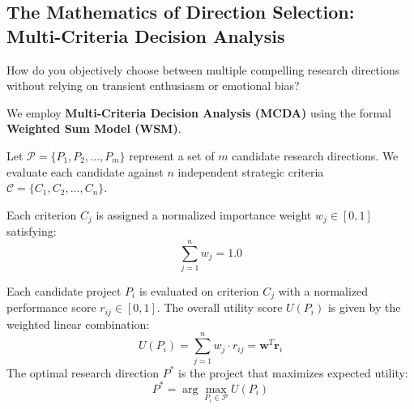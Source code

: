 \subsection{The Mathematics of Direction Selection: Multi-Criteria Decision Analysis}\label{subsec:mcda_model}

How do you objectively choose between multiple compelling research directions without relying on transient enthusiasm or emotional bias? 

We employ \textbf{Multi-Criteria Decision Analysis (MCDA)} using the formal \textbf{Weighted Sum Model (WSM)}.

\begin{keyidea}
Let $\mathcal{P} = \{P_1, P_2, \dots, P_m\}$ represent a set of $m$ candidate research directions. We evaluate each candidate against $n$ independent strategic criteria $\mathcal{C} = \{C_1, C_2, \dots, C_n\}$.

Each criterion $C_j$ is assigned a normalized importance weight $w_j \in [0, 1]$ satisfying:
\begin{equation}
\sum_{j=1}^{n} w_j = 1.0\label{eq:sum_weights}
\end{equation}

Each candidate project $P_i$ is evaluated on criterion $C_j$ with a normalized performance score $r_{ij} \in [0, 1]$. The overall utility score $U(P_i)$ is given by the weighted linear combination:
\begin{equation}
U(P_i) = \sum_{j=1}^{n} w_j \cdot r_{ij} = \mathbf{w}^T \mathbf{r}_i\label{eq:utility_score}
\end{equation}
The optimal research direction $P^*$ is the project that maximizes expected utility:
\begin{equation}
P^* = \arg\max_{P_i \in \mathcal{P}} U(P_i)
\end{equation}
\end{keyidea}

